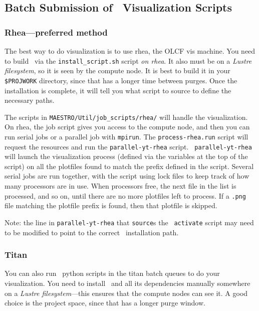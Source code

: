 \subsection{Batch Submission of \yt\ Visualization Scripts}

\subsubsection{Rhea---preferred method}

The best way to do visualization is to use rhea, the OLCF vis machine.
You need to build \yt\ via the {\tt install\_script.sh} script {\em on
rhea}.  It also must be on a {\em Lustre filesystem}, so it is seen by
the compute node.  It is best to build it in your {\tt \$PROJWORK} directory,
since that has a longer time between purges.  Once the installation is
complete, it will tell you what script to source to define the
necessary paths.

The scripts in {\tt MAESTRO/Util/job\_scripts/rhea/} will handle the
visualization.  On rhea, the job script gives you access to the
compute node, and then you can run serial jobs or a parallel job with
{\tt mpirun}.  The {\tt process-rhea.run} script will request the
resources and run the {\tt parallel-yt-rhea} script.  {\tt
parallel-yt-rhea} will launch the visualization process (defined
via the variables at the top of the script) on all the plotfiles
found to match the prefix defined in the script.  Several serial
jobs are run together, with the script using lock files to keep track
of how many processors are in use.  When processors free, the next
file in the list is processed, and so on, until there are no more
plotfiles left to process.  If a {\tt .png} file matching the
plotfile prefix is found, then that plotfile is skipped.

Note: the line in {\tt parallel-yt-rhea} that {\tt source}s the \yt\
{\tt activate} script may need to be modified to point to the
correct \yt\ installation path.


\subsubsection{Titan}

You can also run \yt\ python scripts in the titan batch queues to do your
visualization.  You need to install \yt\ and all its dependencies
manually somewhere on a {\em Lustre filesystem}---this ensures that the
compute nodes can see it.  A good choice is the project space, since
that has a longer purge window.

